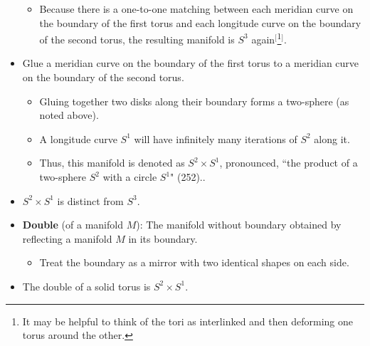 \documentclass[titlepage]{article}
\numberwithin{figure}{section}
\numberwithin{table}{section}
\numberwithin{equation}{section}
\newcommand{\dq}[2]{``#1" (#2).}
\begin{document}
\begin{itemize}
    \begin{itemize}
        \item Because there is a one-to-one matching between each meridian curve on the boundary of the first torus and each longitude curve on the boundary of the second torus, the resulting manifold is $S^3$ again$^[$\footnote{It may be helpful to think of the tori as interlinked and then deforming one torus around the other.}$^]$.
    \end{itemize}
    \item Glue a meridian curve on the boundary of the first torus to a meridian curve on the boundary of the second torus.
    \begin{itemize}
        \item Gluing together two disks along their boundary forms a two-sphere (as noted above).
        \item A longitude curve $S^1$ will have infinitely many iterations of $S^2$ along it.
        \item Thus, this manifold is denoted as $S^2\times S^1$, pronounced, \dq{the product of a two-sphere $S^2$ with a circle $S^1$}{252}.
    \end{itemize}
    \item $S^2\times S^1$ is distinct from $S^3$.
    \item \textbf{Double} (of a manifold $M$): The manifold without boundary obtained by reflecting a manifold $M$ in its boundary.
    \begin{itemize}
        \item Treat the boundary as a mirror with two identical shapes on each side.
    \end{itemize}
    \item The double of a solid torus is $S^2\times S^1$.
    \begin{figure}[h!]
        \centering
\end{figure}
\end{itemize}
\end{document}
